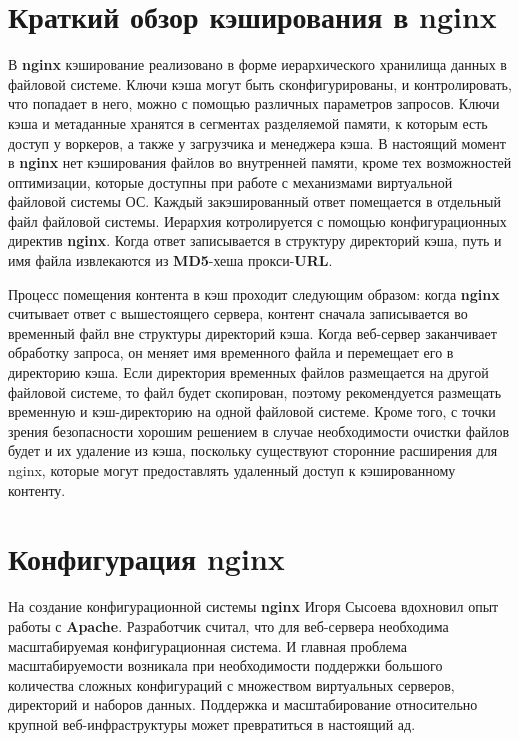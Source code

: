 \documentclass[14pt, a4paper]{article}
\begin{document}
\section*{Краткий обзор кэширования в nginx}
В \textbf{nginx} кэширование реализовано в форме иерархического хранилища данных в файловой системе. 
Ключи кэша могут быть сконфигурированы, и контролировать, что попадает в него, можно с 
помощью различных параметров запросов. Ключи кэша и метаданные хранятся в сегментах разделяемой 
памяти, к которым есть доступ у воркеров, а также у загрузчика и менеджера кэша. В настоящий 
момент в \textbf{nginx} нет кэширования файлов во внутренней памяти, кроме тех возможностей оптимизации, 
которые доступны при работе с механизмами виртуальной файловой системы ОС. Каждый закэшированный 
ответ помещается в отдельный файл файловой системы. Иерархия котролируется с помощью конфигурационных 
директив \textbf{nginx}. Когда ответ записывается в структуру директорий кэша, путь и имя файла извлекаются 
из \textbf{MD5}-хеша прокси-\textbf{URL}.

Процесс помещения контента в кэш проходит следующим образом: когда \textbf{nginx} считывает ответ 
с вышестоящего сервера, контент сначала записывается во временный файл вне структуры 
директорий кэша. Когда веб-сервер заканчивает обработку запроса, он меняет имя временного 
файла и перемещает его в директорию кэша. Если директория временных файлов размещается на 
другой файловой системе, то файл будет скопирован, поэтому рекомендуется размещать временную 
и кэш-директорию на одной файловой системе. Кроме того, с точки зрения безопасности хорошим 
решением в случае необходимости очистки файлов будет и их удаление из кэша, поскольку существуют 
сторонние расширения для nginx, которые могут предоставлять удаленный доступ к кэшированному контенту.


\section*{Конфигурация nginx}
На создание конфигурационной системы \textbf{nginx} Игоря Сысоева вдохновил опыт работы с \textbf{Apache}. 
Разработчик считал, что для веб-сервера необходима масштабируемая конфигурационная система.
И главная проблема масштабируемости возникала при необходимости поддержки большого количества 
сложных конфигураций с множеством виртуальных серверов, директорий и наборов данных. Поддержка 
и масштабирование относительно крупной веб-инфраструктуры может превратиться в настоящий ад.
\end{document}

